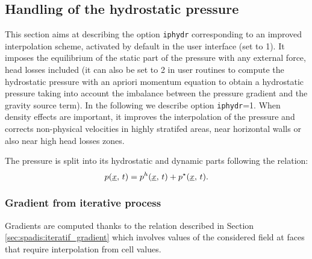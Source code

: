 \subsection{Handling of the hydrostatic pressure}
\label{sec:spadis:iphydr}

This section aims at describing the option \texttt{iphydr} corresponding to an
improved interpolation scheme, activated by default in the user interface (set
to 1). It imposes the equilibrium of the static part of the pressure with any
external force, head losses included (it can also be set to 2 in user routines
to compute the hydrostatic pressure with an apriori momentum equation to obtain
a hydrostatic pressure taking into account the imbalance between the pressure
gradient and the gravity source term). In the following we describe option
\texttt{iphydr}=1. When density effects are important, it improves the
interpolation of the pressure and corrects non-physical velocities in highly
stratifed areas, near horizontal walls or also near high head losses zones.

The pressure is split into its hydrostatic and dynamic parts following the
relation:
\begin{equation}
	\label{eqn:ph}
    p(\underline{x}, \, t ) = p^h(\underline{x}, \, t) + p^\star(\underline{x}, \, t).
\end{equation}

\subsubsection{Gradient from iterative process} Gradients are computed thanks
to the relation described in Section \ref{sec:spadis:iteratif_gradient} which
involves values of the considered field at faces that require interpolation
from cell values.

